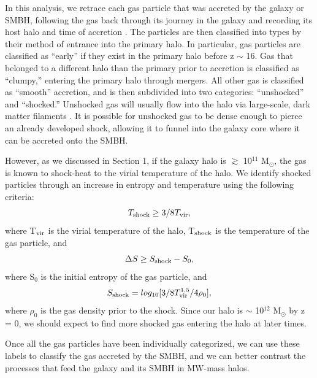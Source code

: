 \documentclass[]{emulateapj}
\begin{document}
In this analysis, we retrace each gas particle that was accreted by the galaxy or SMBH, following the gas back through its journey in the galaxy and recording its host halo and time of accretion \citep{Brooks2009}. The particles are then classified into types by their method of entrance into the primary halo. In particular, gas particles are classified as ``early'' if they exist in the primary halo before z $\sim$ 16. Gas that belonged to a different halo than the primary prior to accretion is classified as ``clumpy,'' entering the primary halo through mergers. All other gas is classified as ``smooth'' accretion, and is then subdivided into two categories: ``unshocked'' and ``shocked.'' Unshocked gas will usually flow into the halo via large-scale, dark matter filaments \citep{Keres2005,Bellovary2013}. It is possible for unshocked gas to be dense enough to pierce an already developed shock, allowing it to funnel into the galaxy core where it can be accreted onto the SMBH.

However, as we discussed in Section 1, if the galaxy halo is $\gtrsim$ 10$^{11}$ M$_{\odot} $, the gas is known to shock-heat to the virial temperature of the halo. We identify shocked particles through an increase in entropy and temperature using the following criteria:
\begin{equation}
T_{\rm shock} \geq 3/8 T_{\rm vir},
\end{equation}
where T$_{\rm vir}$ is the virial temperature of the halo, T$_{\rm shock}$ is the temperature of the gas particle, and 
\begin{equation}
\Delta S \geq S_{\rm shock} - S_0,
\end{equation}
where S$_0$ is the initial entropy of the gas particle, and 
\begin{equation}
S_{\rm shock} = log_{10}[3/8 T_{\rm vir}^{1.5}/4 \rho_0],
\end{equation}
where $\rho_0$ is the gas density prior to the shock. Since our halo is $\sim$ 10$^{12}$ M$_{\odot} $ by z = 0, we should expect to find more shocked gas entering the halo at later times.

Once all the gas particles have been individually categorized, we can use these labels to classify the gas accreted by the SMBH, and we can better contrast the processes that feed the galaxy and its SMBH in MW-mass halos.

\end{document}
